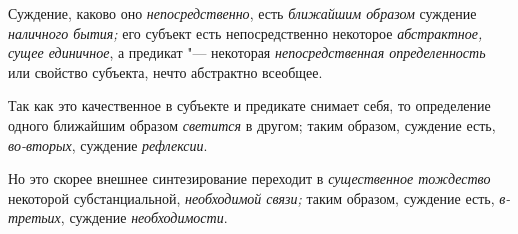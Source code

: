 Суждение, каково оно {\em непосредственно}, есть {\em ближайшим образом}
суждение {\em наличного бытия;} его субъект есть непосредственно некоторое
{\em абстрактное, сущее единичное}, а предикат "--- некоторая
{\em непосредственная определенность} или свойство субъекта, нечто
абстрактно всеобщее.

Так как это качественное в субъекте и предикате снимает себя,
то определение одного ближайшим образом {\em светится} в другом;
таким образом, суждение есть, {\em во-вторых}, суждение {\em рефлексии}.

Но это скорее внешнее синтезирование
переходит в {\em существенное тождество} некоторой субстанциальной,
{\em необходимой связи;} таким образом, суждение есть, {\em в-третьих},
суждение {\em необходимости}.

